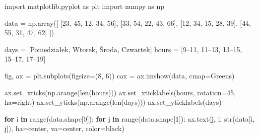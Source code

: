 \documentclass[
  polish,
  letterpaper,
  DIV=11,
  numbers=noendperiod]{scrreprt}
\newenvironment{Shaded}{\begin{snugshade}}{\end{snugshade}}
\newcommand{\BuiltInTok}[1]{\textcolor[rgb]{0.00,0.23,0.31}{#1}}
\newcommand{\ControlFlowTok}[1]{\textcolor[rgb]{0.00,0.23,0.31}{\textbf{#1}}}
\newcommand{\DecValTok}[1]{\textcolor[rgb]{0.68,0.00,0.00}{#1}}
\newcommand{\ImportTok}[1]{\textcolor[rgb]{0.00,0.46,0.62}{#1}}
\newcommand{\KeywordTok}[1]{\textcolor[rgb]{0.00,0.23,0.31}{\textbf{#1}}}
\newcommand{\NormalTok}[1]{\textcolor[rgb]{0.00,0.23,0.31}{#1}}
\newcommand{\OperatorTok}[1]{\textcolor[rgb]{0.37,0.37,0.37}{#1}}
\newcommand{\StringTok}[1]{\textcolor[rgb]{0.13,0.47,0.30}{#1}}
\begin{document}
\begin{Shaded}
\begin{Highlighting}[]
\ImportTok{import}\NormalTok{ matplotlib.pyplot }\ImportTok{as}\NormalTok{ plt}
\ImportTok{import}\NormalTok{ numpy }\ImportTok{as}\NormalTok{ np}

\NormalTok{data }\OperatorTok{=}\NormalTok{ np.array([}
\NormalTok{    [}\DecValTok{23}\NormalTok{, }\DecValTok{45}\NormalTok{, }\DecValTok{12}\NormalTok{, }\DecValTok{34}\NormalTok{, }\DecValTok{56}\NormalTok{],}
\NormalTok{    [}\DecValTok{33}\NormalTok{, }\DecValTok{54}\NormalTok{, }\DecValTok{22}\NormalTok{, }\DecValTok{43}\NormalTok{, }\DecValTok{66}\NormalTok{],}
\NormalTok{    [}\DecValTok{12}\NormalTok{, }\DecValTok{34}\NormalTok{, }\DecValTok{15}\NormalTok{, }\DecValTok{28}\NormalTok{, }\DecValTok{39}\NormalTok{],}
\NormalTok{    [}\DecValTok{44}\NormalTok{, }\DecValTok{55}\NormalTok{, }\DecValTok{31}\NormalTok{, }\DecValTok{47}\NormalTok{, }\DecValTok{62}\NormalTok{]}
\NormalTok{])}

\NormalTok{days }\OperatorTok{=}\NormalTok{ [}\StringTok{\textquotesingle{}Poniedziałek\textquotesingle{}}\NormalTok{, }\StringTok{\textquotesingle{}Wtorek\textquotesingle{}}\NormalTok{, }\StringTok{\textquotesingle{}Środa\textquotesingle{}}\NormalTok{, }\StringTok{\textquotesingle{}Czwartek\textquotesingle{}}\NormalTok{]}
\NormalTok{hours }\OperatorTok{=}\NormalTok{ [}\StringTok{\textquotesingle{}9–11\textquotesingle{}}\NormalTok{, }\StringTok{\textquotesingle{}11–13\textquotesingle{}}\NormalTok{, }\StringTok{\textquotesingle{}13–15\textquotesingle{}}\NormalTok{, }\StringTok{\textquotesingle{}15–17\textquotesingle{}}\NormalTok{, }\StringTok{\textquotesingle{}17–19\textquotesingle{}}\NormalTok{]}

\NormalTok{fig, ax }\OperatorTok{=}\NormalTok{ plt.subplots(figsize}\OperatorTok{=}\NormalTok{(}\DecValTok{8}\NormalTok{, }\DecValTok{6}\NormalTok{))}
\NormalTok{cax }\OperatorTok{=}\NormalTok{ ax.imshow(data, cmap}\OperatorTok{=}\StringTok{\textquotesingle{}Greens\textquotesingle{}}\NormalTok{)}

\NormalTok{ax.set\_xticks(np.arange(}\BuiltInTok{len}\NormalTok{(hours)))}
\NormalTok{ax.set\_xticklabels(hours, rotation}\OperatorTok{=}\DecValTok{45}\NormalTok{, ha}\OperatorTok{=}\StringTok{\textquotesingle{}right\textquotesingle{}}\NormalTok{)}
\NormalTok{ax.set\_yticks(np.arange(}\BuiltInTok{len}\NormalTok{(days)))}
\NormalTok{ax.set\_yticklabels(days)}

\ControlFlowTok{for}\NormalTok{ i }\KeywordTok{in} \BuiltInTok{range}\NormalTok{(data.shape[}\DecValTok{0}\NormalTok{]):}
    \ControlFlowTok{for}\NormalTok{ j }\KeywordTok{in} \BuiltInTok{range}\NormalTok{(data.shape[}\DecValTok{1}\NormalTok{]):}
\NormalTok{        ax.text(j, i, }\BuiltInTok{str}\NormalTok{(data[i, j]), ha}\OperatorTok{=}\StringTok{\textquotesingle{}center\textquotesingle{}}\NormalTok{, va}\OperatorTok{=}\StringTok{\textquotesingle{}center\textquotesingle{}}\NormalTok{, color}\OperatorTok{=}\StringTok{\textquotesingle{}black\textquotesingle{}}\NormalTok{)}


\end{Highlighting}
\end{Shaded}
\end{document}
